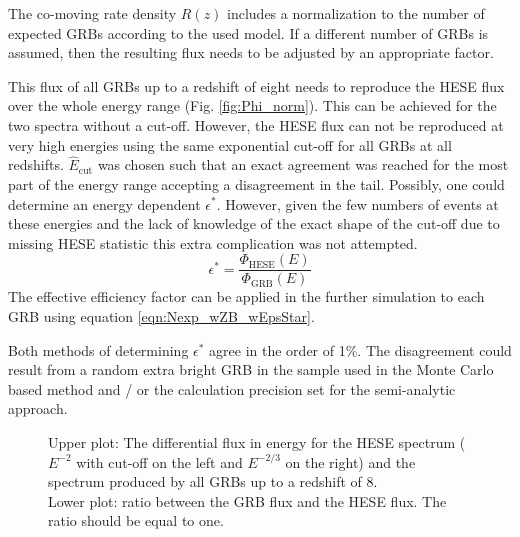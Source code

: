 

The co-moving rate density $R(z)$ includes a normalization to the number of
expected GRBs according to the used model. If a different number of GRBs is
assumed, then the resulting flux needs to be adjusted by an appropriate factor.

This flux of all GRBs up to a redshift of eight needs to reproduce the HESE
flux over the whole energy range (Fig. \ref{fig:Phi_norm}). This can be
achieved for the two spectra without a cut-off.
However, the HESE flux can not be reproduced at very high energies using the
same
exponential cut-off for all GRBs at all redshifts. $\hat{E}_\text{cut}$ was
chosen such that an exact agreement was reached for the most part of the energy
range accepting a disagreement in the tail. Possibly, one could determine an
energy dependent $\epsilon^*$. However, given the few numbers of events at
these energies and the lack of knowledge of the exact shape of the cut-off due
to missing HESE statistic this extra complication was not attempted.
\begin{equation}
 \epsilon^* = \frac{\Phi_\text{HESE}(E)}{\Phi_\text{GRB}(E)}
\end{equation}
The effective efficiency factor can be applied in the further simulation to
each GRB using equation \ref{eqn:Nexp_wZB_wEpsStar}.

Both methods of determining $\epsilon^*$ agree in the order of 1\%. The 
disagreement could result from a random extra bright GRB in the sample used in 
the Monte Carlo based method and / or the calculation precision set for the 
semi-analytic approach.
\begin{figure}[h]
 \centering
 \captionsetup{width=.9\textwidth}
 \caption{Upper plot: The differential flux in energy for the HESE spectrum
($E^{-2}$ with cut-off on the left and $E^{-2/3}$ on the right) and the 
spectrum produced by all GRBs up to a redshift
of 8. \\
Lower plot: ratio between the GRB flux and the HESE flux. The ratio should be
equal to one.}
\end{figure}



